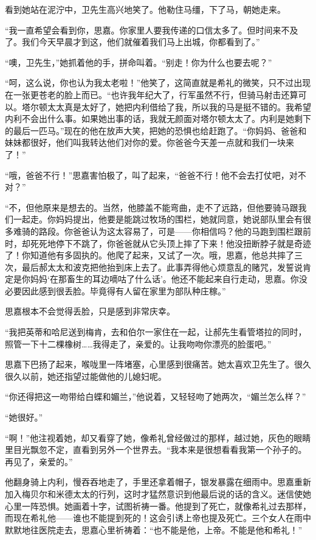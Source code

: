 \par 看到她站在泥泞中，卫先生高兴地笑了。他勒住马缰，下了马，朝她走来。
\par “我一直希望会看到你，思嘉。你家里人要我传递的口信太多了。但时间来不及了。我们今天早晨才到这，他们就催着我们马上出城，你都看到了。”
\par “噢，卫先生，”她抓着他的手，拼命叫着。“别走！你为什么也要去呢？”
\par “呵，这么说，你也认为我太老啦！”他笑了，这简直就是希礼的微笑，只不过出现在一张更苍老的脸上而已。“也许我年纪大了，行军虽然不行，但骑马射击还算可以。塔尔顿太太真是太好了，她把内利借给了我，所以我的马是挺不错的。我希望内利不会出什么事。如果她出事的话，我就无颜面对塔尔顿太太了。内利是她剩下的最后一匹马。”现在的他在放声大笑，把她的恐惧也给赶跑了。“你妈妈、爸爸和妹妹都很好，他们叫我转达他们对你的爱。你爸爸今天差一点就和我们一块来了！”
\par “哦，爸爸不行！”思嘉害怕极了，叫了起来，“爸爸不行！他不会去打仗吧，对不对？”
\par “不，但他原来是想去的。当然，他膝盖不能弯曲，走不了远路，但他要骑马跟我们一起走。你妈妈提出，他要是能跳过牧场的围栏，她就同意，她说部队里会有很多难骑的路段。你爸爸认为这太容易了，可是——你相信吗？他的马跑到围栏跟前时，却死死地停下不跳了，你爸爸就从它头顶上摔了下来！他没扭断脖子就是奇迹了！你知道他有多固执的。他爬了起来，又试了一次。哦，思嘉，他总共摔了三次，最后郝太太和波克把他抬到床上去了。此事弄得他心烦意乱的赌咒，发誓说肯定是你妈妈‘在那畜生的耳边嘀咕了什么话’。他还不能起来自行走动，思嘉。你没必要因此感到很丢脸。毕竟得有人留在家里为部队种庄稼。”
\par 思嘉根本不会觉得丢脸，只是感到非常庆幸。
\par “我把英蒂和哈尼送到梅肯，去和伯尔一家住在一起，让郝先生看管塔拉的同时，照管一下十二棵橡树……我得走了，亲爱的。让我吻吻你漂亮的脸蛋吧。”
\par 思嘉下巴扬了起来，喉咙里一阵堵塞，心里感到很痛苦。她太喜欢卫先生了。很久很久以前，她还指望过能做他的儿媳妇呢。
\par “你还得把这一吻带给白蝶和媚兰，”他说着，又轻轻吻了她两次，“媚兰怎么样？”
\par “她很好。”
\par “啊！”他注视着她，却又看穿了她，像希礼曾经做过的那样，越过她，灰色的眼睛里目光飘忽不定，直看到另外一个世界去。“我本来是很想看看我第一个孙子的。再见了，亲爱的。”
\par 他翻身骑上内利，慢吞吞地走了，手里还拿着帽子，银发暴露在细雨中。思嘉重新加入梅贝尔和米德太太的行列，这时才猛然意识到他最后说的话的含义。迷信使她心里一阵恐惧。她画着十字，试图祈祷一番。他提到了死亡，就像希礼过去那样，而现在希礼他——谁也不能提到死的！这会引诱上帝也提及死亡。三个女人在雨中默默地往医院走去，思嘉心里祈祷着：“也不能是他，上帝。不能是他和希礼！”
